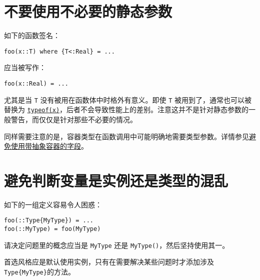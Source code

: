 \hypertarget{13140702923511466392}{}


\section{不要使用不必要的静态参数}



如下的函数签名：




\begin{verbatim}
foo(x::T) where {T<:Real} = ...
\end{verbatim}



应当被写作：




\begin{verbatim}
foo(x::Real) = ...
\end{verbatim}



尤其是当 \texttt{T} 没有被用在函数体中时格外有意义。即使 \texttt{T} 被用到了，通常也可以被替换为 \hyperlink{13440452181855594120}{\texttt{typeof(x)}}，后者不会导致性能上的差别。注意这并不是针对静态参数的一般警告，而仅仅是针对那些不必要的情况。



同样需要注意的是，容器类型在函数调用中可能明确地需要类型参数。详情参见\hyperlink{11695962945306703148}{避免使用带抽象容器的字段}。



\hypertarget{14321901677948654689}{}


\section{避免判断变量是实例还是类型的混乱}



如下的一组定义容易令人困惑：




\begin{verbatim}
foo(::Type{MyType}) = ...
foo(::MyType) = foo(MyType)
\end{verbatim}



请决定问题里的概念应当是 \texttt{MyType} 还是 \texttt{MyType()}，然后坚持使用其一。



首选风格应是默认使用实例，只有在需要解决某些问题时才添加涉及\texttt{Type\{MyType\}}的方法。



